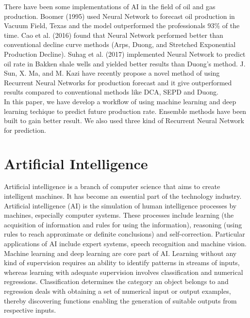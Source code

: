 \documentclass[english]{article}
\begin{document}
There have been some implementations of AI in the field of oil and gas production. Boomer (1995) \cite{Boomer}used Neural Network to forecast oil production in Vacuum Field, Texas and the model outperformed the professionals 93\% of the time. Cao et al. (2016) found that Neural Network performed better than conventional decline curve methods (Arps, Duong, and Stretched Exponential Production Decline). Suhag et al. (2017) \cite{Suhag} implemented Neural Network to predict oil rate in Bakken shale wells and yielded better results than Duong’s method. J. Sun, X. Ma, and M. Kazi \cite{Sun} have recently propose a novel method of using Recurrent Neural Networks for production forecast and it give outperformed results compared to conventional methods like DCA, SEPD and Duong.\\

In this paper, we have develop a workflow of using machine learning and deep learning techique to predict future production rate. Ensemble methods have been built to gain better result. We also used three kind of Recurrent Neural Network for prediction.

\section{Artificial Intelligence}
Artificial intelligence is a branch of computer science that aims to create intelligent machines. It has become an essential part of the technology industry. Artificial intelligence (AI) is the simulation of human intelligence processes by machines, especially computer systems. These processes include learning (the acquisition of information and rules for using the information), reasoning (using rules to reach approximate or definite conclusions) and self-correction. Particular applications of AI include expert systems, speech recognition and machine vision.\\
Machine learning and deep learning are core part of AI. Learning without any kind of supervision requires an ability to identify patterns in streams of inputs, whereas learning with adequate supervision involves classification and numerical regressions. Classification determines the category an object belongs to and regression deals with obtaining a set of numerical input or output examples, thereby discovering functions enabling the generation of suitable outputs from respective inputs.\\
\end{document}

